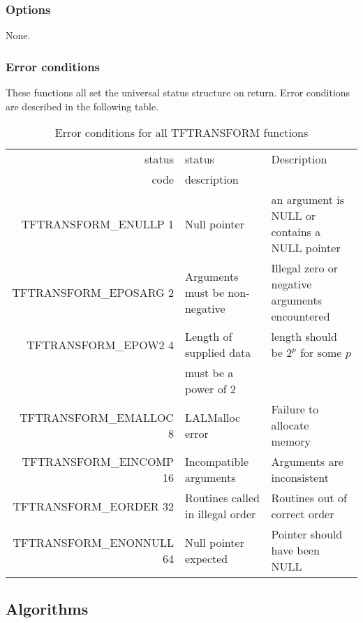 \documentclass{article}
\begin{document}
\subsubsection{Options}

None. 

\subsubsection{Error conditions}


These functions all set the universal status structure on return.
Error conditions are described in the following table.





\begin{table}
\begin{tabular}{|r|l|p{2in}|}\hline
status  & status          & Description\\
code    & description     & \\\hline
TFTRANSFORM\_ENULLP 1   & Null pointer
  & an argument is NULL or contains a NULL pointer\\
TFTRANSFORM\_EPOSARG 2   & Arguments must be non-negative
  & Illegal zero or negative arguments encountered \\
TFTRANSFORM\_EPOW2   4  & Length of supplied data
  & length should be $2^p$ for some $p$\\ 
 \, & must be a power of 2 & \, \\
TFTRANSFORM\_EMALLOC 8   & LALMalloc error
  & Failure to allocate memory\\
TFTRANSFORM\_EINCOMP 16   & Incompatible arguments
  & Arguments are inconsistent\\
TFTRANSFORM\_EORDER 32   & Routines called in illegal order
  & Routines out of correct order\\
TFTRANSFORM\_ENONNULL 64   & Null pointer expected
  & Pointer should have been NULL\\


\hline
\end{tabular}
\caption{Error conditions for all TFTRANSFORM functions}\label{tbl:CV}
\end{table}
                                
\subsection{Algorithms}
\end{document}
